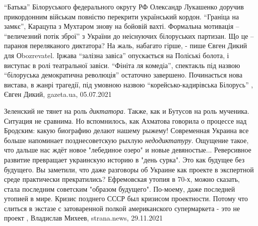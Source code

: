 \enquote{Батька} Білоруського федерального округу РФ Олександр Лукашенко
доручив прикордонним військам повністю перекрити український кордон.
\enquote{Граніца на замкє}, Карацупа з Мухтаром знову на бойовій вахті.
Формальна мотивація – \enquote{величезний потік зброї} з України до неіснуючих
білоруських партизан. Що це – параноя переляканого диктатора? На жаль, набагато
гірше, - пише Євген Дикий для Оbozrevatel.  Іржава \enquote{залізна завіса}
опускається на Поліські болота, і виступає в ролі театральної завіси.
\enquote{Фініта ля комедіа}, спектакль під назвою \enquote{білоруська
демократична революція} остаточно завершено. Починається нова вистава, в жанрі
трагедії, під умовною назвою \enquote{корейсько-кадирівська Білорусь}
, 
Євген Дикий, gazeta.ua, 05.07.2021

Зеленский не тянет на роль \emph{диктатора}. Также, как и Бутусов на роль
мученика.  Ситуация не сравнима. Но вспомнилось, как Ахматова говорила о
процессе над Бродским: какую биографию делают нашему рыжему!  Современная
Украина все больше напоминает позднесоветскую рыхлую \emph{недодиктатуру}.
Ощущение такое, что дальше нас ждёт новое "лебединое озеро" и новые
девяностые...  Реверсивное развитие превращает украинскую историю в "день
сурка".  Это как будущее без будущего. Вы заметили, что даже разговоры об
Украине как проекте в экспертной среде практически прекратились?  Ефремовская
утопия в 70-х, можно сказать, стала последним советским "образом будущего".
По-моему, даже последней утопией в мире.  Кризис позднего СССР был кризисом
проектности. Потому что слиться в экстазе с затоваренной полкой американского
супермаркета - это не проект
, 
Владислав Михеев, strana.news, 29.11.2021
